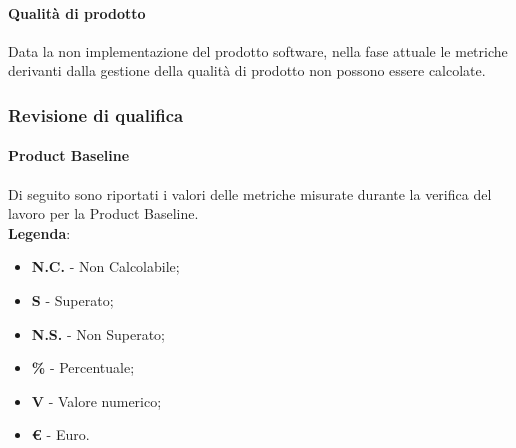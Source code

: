	\paragraph{Qualità di prodotto}
	Data la non implementazione del prodotto software, nella fase attuale le metriche derivanti dalla gestione della qualità di prodotto non possono essere calcolate.
\newpage
	\subsubsection{Revisione di qualifica}
 		\paragraph{Product Baseline}
 		Di seguito sono riportati i valori delle metriche misurate durante la verifica del lavoro per la Product Baseline.\\
\textbf{Legenda}:
 		\begin{itemize}
 			\item \textbf{N.C.} - Non Calcolabile;
 			\item \textbf{S} - Superato;
 			\item \textbf{N.S.} - Non Superato;
 			\item \textbf{\%} - Percentuale;
 			\item \textbf{V} - Valore numerico;
 			\item \textbf{\euro{}} - Euro.
 		\end{itemize}
 		

